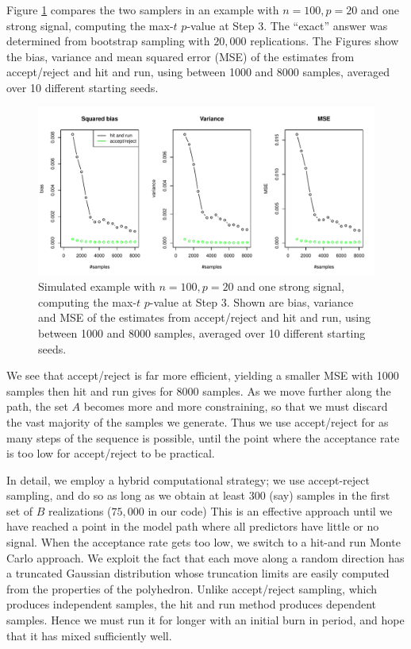 \documentclass{article}
\begin{document}
\begin{appendix}
Figure \ref{fig:comparison} compares the two samplers in an example with $n=100, p=20$ and one strong signal, computing the max-$t$ $p$-value at Step 3.
The ``exact'' answer was determined from bootstrap sampling with $20,000$ replications.
The Figures show the bias, variance and mean squared error (MSE) of the estimates from accept/reject and hit and run, using between 1000 and 8000 samples, averaged
over 10 different starting seeds.
\begin{figure}[htp]
\centering
  \includegraphics[width=\textwidth]{figs/comparison.pdf}
  \caption{ Simulated example with $n= 100, p=20$ and one strong signal, computing the max-$t$ $p$-value at Step 3.  Shown are bias, variance and MSE of the estimates from accept/reject and hit and run, using between 1000 and 8000 samples, averaged over 10 different starting seeds.
}
\label{fig:comparison}
\end{figure}
We see that accept/reject is far more efficient, yielding a smaller MSE with 1000 samples then hit and run gives for 8000 samples. As we move further along the path, the set $A$ becomes more and more constraining, so that we must discard the vast majority of the samples we generate. Thus we use accept/reject for as many steps of the sequence is possible,  until the point where the acceptance rate is too low for accept/reject to be practical.

In detail, we employ a hybrid computational strategy; we use accept-reject sampling, and do so as long as we obtain at least 300 (say) samples in the first set of $B$ realizations ($75,000$ in our code)  This is an effective approach until we have reached a point in the model path where all predictors have little or no signal. When the acceptance rate gets too low, we switch to a hit-and run Monte Carlo approach. We exploit the fact that each move along a random direction  has a truncated Gaussian distribution whose truncation limits are easily computed from the properties of the polyhedron. Unlike accept/reject sampling, which produces independent samples,  the hit and run method produces dependent samples. Hence we must run it for longer with an initial burn in period, and hope that it has mixed sufficiently well.


\end{appendix}
\end{document}
